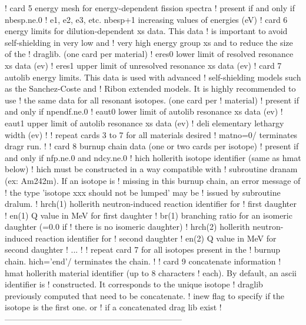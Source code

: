 \begin{ccode}
   ! card 5 energy mesh for energy-dependent fission spectra
   ! present if and only if nbesp.ne.0
   !   e1, e2, e3, etc. nbesp+1 increasing values of energies (eV)
   ! card 6 energy limits for dilution-dependent xs data. This data
   !        is important to avoid self-shielding in very low and
   !        very high energy group xs and to reduce the size of the
   !        draglib. (one card per material)
   !   eres0     lower limit of resolved resonance xs data (ev)
   !   eres1     upper limit of unresolved resonance xs data (ev)
   ! card 7 autolib energy limits. This data is used with advanced
   !        self-shielding models such as the Sanchez-Coste and
   !        Ribon extended models. It is highly recommended to use
   !        the same data for all resonant isotopes. (one card per
   !        material)
   ! present if and only if npendf.ne.0
   !   eaut0     lower limit of autolib resonance xs data (ev)
   !   eaut1     upper limit of autolib resonance xs data (ev)
   !   deli      elementary lethargy width (ev)
   !
   !            repeat cards 3 to 7 for all materials desired
   !            matno=0/ terminates dragr run.
   !
   ! card 8 burnup chain data (one or two cards per isotope)
   ! present if and only if nfp.ne.0 and ndcy.ne.0
   !  hich      hollerith isotope identifier (same as hmat below)
   !            hich must be constructed in a way compatible with
   !            subroutine dranam (ex: Am242m). If an isotope is
   !            missing in this burnup chain, an error message of
   !            the type 'isotope xxx should not be lumped' may be
   !            issued by subroutine dralum.
   !  hrch(1)   hollerith neutron-induced reaction identifier for
   !            first daughter
   !  en(1)     Q value in MeV for first daughter
   !  br(1)     branching ratio for an isomeric daughter (=0.0 if
   !            there is no isomeric daughter)
   !  hrch(2)   hollerith neutron-induced reaction identifier for
   !            second daughter
   !  en(2)     Q value in MeV for second daughter
   !  ...
   !
   !            repeat card 7 for all isotopes present in the
   !            burnup chain. hich='end'/ terminates the chain.
   !
   ! card 9 concatenate information
   !   hmat      hollerith material identifier (up to 8 characters
   !             each). By default, an ascii identifier is
   !             constructed. It corresponds to the unique isotope 
   !             draglib previously computed that need to be concatenate.
   !   inew      flag to specify if the isotope is the first one. or 
   !             if a concatenated drag lib exist
   !-----------------------------------------------------------------

\end{ccode}
\normalsize

